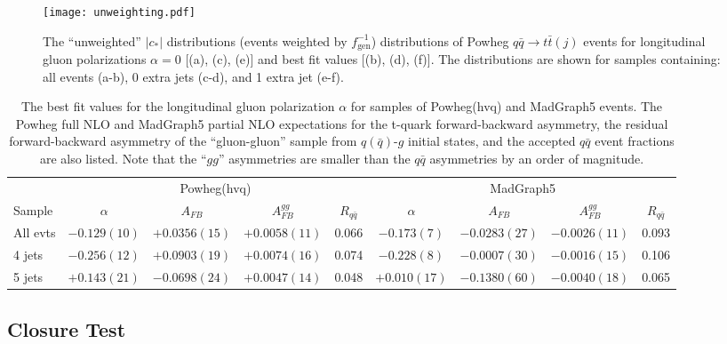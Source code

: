 \documentclass{cmspaperpdf}
\begin{document}
 \begin{figure}[hbt]
  \begin{center}
    \texttt{[image: unweighting.pdf]}
  \caption{\small The ``unweighted'' $|c_*|$ distributions (events weighted by $f_\mathrm{gen}^{-1}$) distributions of Powheg $q\bar q\to t\bar t(j)$ events for longitudinal gluon polarizations $\alpha=0$ [(a), (c), (e)] and best fit values [(b), (d), (f)].  The distributions are shown for samples containing: all events (a-b), 0 extra jets (c-d), and 1 extra jet (e-f).}
    \label{fig:unweight_test}
  \end{center}
\end{figure}

\begin{table}[hbt]
\begin{center}
\caption{\small \label{tab:alpha_tune} The best fit values for the longitudinal gluon polarization $\alpha$ for samples of Powheg(hvq) and MadGraph5 events.  The Powheg full NLO and MadGraph5 partial NLO expectations for the t-quark forward-backward asymmetry, the residual forward-backward asymmetry of the ``gluon-gluon'' sample from $q(\bar q)$-$g$ initial states, and the accepted $q\bar q$ event fractions are also listed.  Note that the ``$gg$'' asymmetries are smaller than the $q\bar q$ asymmetries by an order of magnitude.}
\vspace{3pt}
\begin{tabular}{|l|cccc|cccc|}\hline
 & \multicolumn{4}{c}{Powheg(hvq)} &  \multicolumn{4}{|c|}{MadGraph5} \\ 
Sample    & $\alpha$      &  $A_{FB}$      & $A_{FB}^{gg}$ &  $R_{q\bar q}$ &  $\alpha$    &  $A_{FB}$      & $A_{FB}^{gg}$ &  $R_{q\bar q}$ \\ \hline
All evts  & $-0.129(10)$  & $+0.0356(15)$  & $+0.0058(11)$ & 0.066          & $-0.173(7)$  & $-0.0283(27)$  & $-0.0026(11)$ & 0.093          \\ 
4 jets    & $-0.256(12)$  & $+0.0903(19)$  & $+0.0074(16)$ & 0.074          & $-0.228(8)$  & $-0.0007(30)$  & $-0.0016(15)$ & 0.106          \\ 
5 jets    &  $+0.143(21)$ &  $-0.0698(24)$ & $+0.0047(14)$ & 0.048          & $+0.010(17)$ &  $-0.1380(60)$ & $-0.0040(18)$ & 0.065          \\ 
\hline
\end{tabular}
\end{center}
\end{table}


\subsection{Closure Test}
\end{document}
